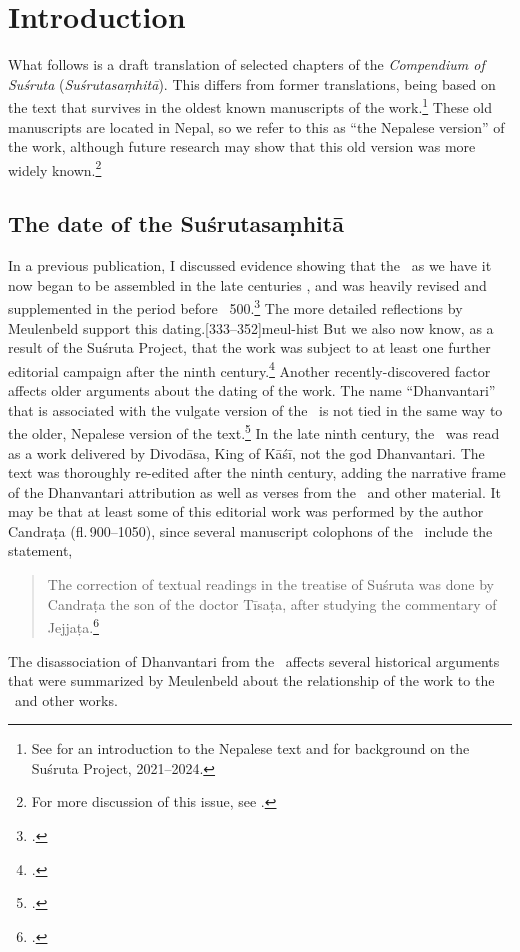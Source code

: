 
\chapter{Introduction}

What follows is a draft translation of selected chapters of the
\emph{Compendium of Suśruta} (\emph{Suśrutasaṃhitā}).  This differs
from former translations, being based on the text that survives in the
oldest known manuscripts of the work.\footnote{See \cite{wuja-2023}
    for an introduction to the Nepalese text and \cite{wuja-2021b} for
    background on the Suśruta Project, 2021--2024.}  These old manuscripts
    are located in Nepal, so we refer to this as “the Nepalese version” of
    the work, although future research may show that this old version was
    more widely known.\footnote{For more discussion of this issue, see 
    \cite[Introduction and ch.\,2]{wuja-2023}.}  
   
\section{The date of the Suśrutasaṃhitā}

In a previous publication, I discussed evidence showing that the \SS\
as we have it now began to be assembled in the late centuries \BC, and
was heavily revised and supplemented in the period before \CE\
500.\footcite[63--64]{wuja-2003}  The more detailed reflections by
Meulenbeld support this dating.\fvolcite{1A}[333--352]{meul-hist}  But
we also now know, as a result of the Suśruta Project, that the work
was subject to at least one further editorial campaign after the ninth
century.\footcite[16--26]{wuja-2023} Another recently-discovered
factor affects older arguments about the dating of the work. The name
“Dhanvantari” that is associated with the vulgate version of the \SS\
is not tied in the same way to the older, Nepalese version of the
text.\footnote{\cites{birc-2021,wuja-2013,birc-2021a,wuja-2023}.} In
    the late ninth century, the \SS\ was read as a work delivered by
    Divodāsa, King of Kāśī, not the god Dhanvantari.  The text was
    thoroughly re-edited after the ninth century, adding the narrative
    frame of the Dhanvantari attribution as well as verses from the \CS\
    and other material.  It may be that at least some of this editorial
    work was performed by the author Candraṭa (fl.\,900--1050), since
    several manuscript colophons of the \SS\ include the statement,
    \begin{quote}
        The correction of textual readings in the treatise of Suśruta
        was done by Candraṭa the son of the doctor Tīsaṭa, after
        studying the commentary of Jejjaṭa.\footcite{wuja-2024}
    \end{quote}
    The disassociation of Dhanvantari from the \SS\ affects several
historical arguments that were summarized by Meulenbeld about the
relationship of the work to the \CS\ and other works.  

